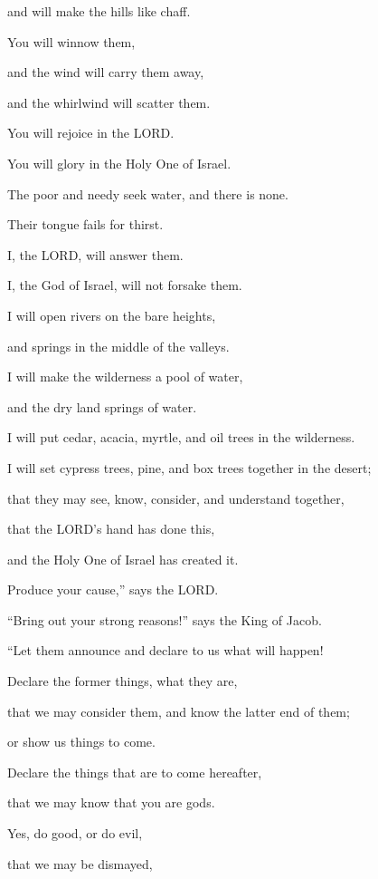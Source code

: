 and will make the hills like chaff.

\myverse{}You will winnow them,

and the wind will carry them away,

and the whirlwind will scatter them.

You will rejoice in the LORD.

You will glory in the Holy One of Israel.


\vspace{\baselineskip} \myverse{}The poor and needy seek water, and there is none.

Their tongue fails for thirst.

I, the LORD, will answer them.

I, the God of Israel, will not forsake them.

\myverse{}I will open rivers on the bare heights,

and springs in the middle of the valleys.

I will make the wilderness a pool of water,

and the dry land springs of water.

\myverse{}I will put cedar, acacia, myrtle, and oil trees in the wilderness.

I will set cypress trees, pine, and box trees together in the desert;

\myverse{}that they may see, know, consider, and understand
together,

that the LORD’s hand has done this,

and the Holy One of Israel has created it.


\vspace{\baselineskip} \myverse{}Produce your cause,” says the LORD.

“Bring out your strong reasons!” says the King of Jacob.

\myverse{}“Let them announce and declare to us what will happen!

Declare the former things, what they are,

that we may consider them, and know the latter end of them;

or show us things to come.

\myverse{}Declare the things that are to come hereafter,

that we may know that you are gods.

Yes, do good, or do evil,

that we may be dismayed,

